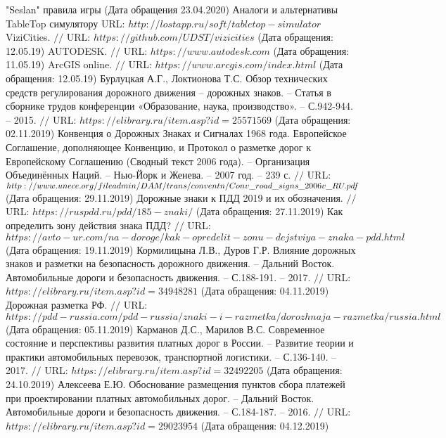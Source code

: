 \makeatletter \renewcommand{} \makeatother
\renewcommand\refname{Список использованных источников}
\begin{thebibliography}{00}
	
	 "Seslan" правила игры (Дата обращения 23.04.2020)
	Аналоги и альтернативы TableTop симулятору
	URL: $http://lostapp.ru/soft/tabletop-simulator$
	ViziCities. $//$ URL: $https://github.com/UDST/vizicities$ (Дата обращения: 12.05.19)
	AUTODESK. $//$ URL: $https://www.autodesk.com$ (Дата обращения: 11.05.19)
	ArcGIS online. $//$ URL: $https://www.arcgis.com/index.html$ (Дата обращения: 12.05.19)
	Бурлуцкая А.Г., Локтионова Т.С. Обзор технических средств регулирования дорожного движения -- дорожных знаков. -- Статья в сборнике трудов конференции «Образование, наука, производство». -- С.942-944. -- 2015. $//$ URL: $https://elibrary.ru/item.asp?id=25571569$ (Дата обращения: 02.11.2019)
	Конвенция о Дорожных Знаках и Сигналах 1968 года. Европейское Соглашение, дополняющее Конвенцию, и Протокол о разметке дорог к Европейскому Соглашению (Сводный текст 2006 года). -- Организация Объединённых Наций. -- Нью-Йорк и Женева. -- 2007 год. -- 239 с. $//$ URL: $http://www.unece.org/fileadmin/DAM/trans/conventn/Conv\_road\_\\
	signs\_2006v\_RU.pdf$ (Дата обращения: 29.11.2019)
	Дорожные знаки к ПДД 2019 и их обозначения. $//$ URL: $https://ruspdd.ru/pdd/185-znaki/$ (Дата обращения: 27.11.2019)
	Как определить зону действия знака ПДД? $//$ URL: $https://avto-ur.com/na-doroge/kak-opredelit-zonu-dejstviya-znaka-pdd.html$ (Дата обращения: 19.11.2019)
	Кормилицына Л.В., Дуров Г.Р. Влияние дорожных знаков и разметки на безопасность дорожного движения. -- Дальний Восток. Автомобильные дороги и безопасность движения. -- С.188-191. -- 2017. $//$ URL: $https://elibrary.ru/item.asp?id=34948281$ (Дата обращения: 04.11.2019)
	Дорожная разметка РФ. $//$ URL: $https://pdd-russia.com/pdd-russia/znaki-i-razmetka/dorozhnaja-razmetka/russia.html$ (Дата обращения: 05.11.2019)
	Карманов Д.С., Марилов В.С. Современное состояние и перспективы развития платных дорог в России. -- Развитие теории и практики автомобильных перевозок, транспортной логистики. -- С.136-140. -- 2017. $//$ URL: $https://elibrary.ru/item.asp?id=32492205$ (Дата обращения: 24.10.2019)
	Алексеева Е.Ю. Обоснование размещения пунктов сбора платежей при проектировании платных автомобильных дорог. -- Дальний Восток. Автомобильные дороги и безопасность движения. -- С.184-187. -- 2016. $//$ URL: $https://elibrary.ru/item.asp?id=29023954$ (Дата обращения: 04.12.2019)

\end{thebibliography}
